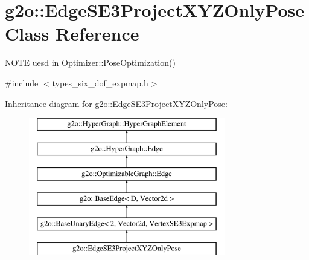 \hypertarget{classg2o_1_1_edge_s_e3_project_x_y_z_only_pose}{}\section{g2o\+:\+:Edge\+S\+E3\+Project\+X\+Y\+Z\+Only\+Pose Class Reference}
\label{classg2o_1_1_edge_s_e3_project_x_y_z_only_pose}


N\+O\+TE uesd in Optimizer\+::\+Pose\+Optimization()  




{\ttfamily \#include $<$types\+\_\+six\+\_\+dof\+\_\+expmap.\+h$>$}

Inheritance diagram for g2o\+:\+:Edge\+S\+E3\+Project\+X\+Y\+Z\+Only\+Pose\+:\begin{figure}[H]
\begin{center}
\leavevmode
\includegraphics[height=6.000000cm]{classg2o_1_1_edge_s_e3_project_x_y_z_only_pose}
\end{center}
\end{figure}

